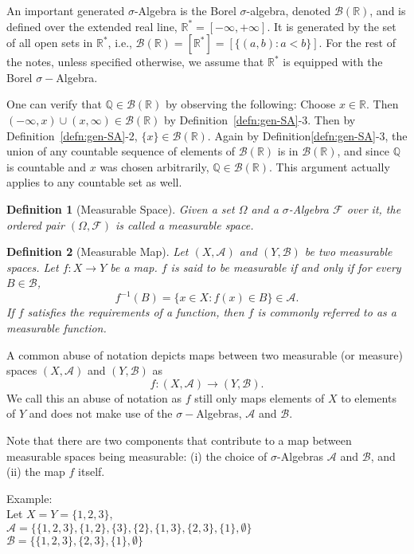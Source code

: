 \documentclass[10pt, oneside]{article}
\newcommand{\R}{\mathbb{R}}
\newcommand{\Q}{\mathbb{Q}}
\newtheorem{defn}{Definition}
\begin{document}
An important generated $\sigma$-Algebra is the Borel $\sigma$-algebra, denoted 
$\mathcal{B}(\R)$, and is defined over the extended real line, $\R^{*} = [-\infty,
+\infty]$. It is generated by the set of all open sets in $\R^{*}$, i.e., 
$\mathcal{B}(\R) = [\R^{*}]=[\{(a,b):a<b\}]$. For the rest of the notes, unless 
specified otherwise, we assume that $\R^{*}$ is equipped with the Borel $\sigma-$Algebra. 

One can verify that $\Q\in \mathcal{B}(\R)$ by observing the following: Choose $x\in \R$. 
Then $(-\infty,x)\cup(x,\infty)\in \mathcal{B}(\R)$ by Definition~\ref{defn:gen-SA}-3.
Then by Definition~\ref{defn:gen-SA}-2, $\{x\}\in \mathcal{B}(\R)$.
Again by Definition\ref{defn:gen-SA}-3, the union of any countable sequence of elements of $\mathcal{B}(\R)$ is in $\mathcal{B}(\R)$, and since $\Q$ is countable and $x$ was chosen arbitrarily, $\Q\in \mathcal{B}(\R)$.
This argument actually applies to any countable set as well.

\begin{defn}[Measurable Space]
    \label{defn:space}
    Given a set $\Omega$ and a $\sigma$-Algebra $\mathcal{F}$ over it, the ordered 
    pair $(\Omega,\mathcal{F})$ is called a measurable space. 
\end{defn}

\begin{defn}[Measurable Map]
    \label{defn:map}
    Let $(X,\mathcal{A})$ and $(Y,\mathcal{B})$ be two measurable spaces. Let 
    $f \colon X \to Y$ be a map. $f$ is said to be measurable if and only if 
    for every $B \in \mathcal{B}$, 
    \[f^{-1}(B) = \{x \in X \colon f(x) \in B\} \in \mathcal{A}.\]
    If $f$ satisfies the requirements of a function, then $f$ is commonly referred 
    to as a measurable function. 
\end{defn}
A common abuse of notation depicts maps between two measurable (or measure) spaces 
$(X,\mathcal{A})$ and $(Y, \mathcal{B})$ as 
\[f \colon (X,\mathcal{A}) \to (Y,\mathcal{B}). \]
We call this an abuse of notation as $f$ still only maps elements of $X$ to elements
of $Y$ and does not make use of the $\sigma-$Algebras, $\mathcal{A}$ and $\mathcal{B}$. 

Note that there are two components that contribute to a map between measurable spaces
being measurable: (i) the choice of $\sigma$-Algebras $\mathcal{A}$ and $\mathcal{B}$,
and (ii) the map $f$ itself. 

Example:\\ Let $X=Y=\{1,2,3\}$, \\$\mathcal{A}=\{\{1,2,3\},\{1,2\},\{3\},\{2\},\{1,3\},\{2,3\},\{1\},\emptyset\}$ \\ $\mathcal{B}=\{\{1,2,3\},\{2,3\},\{1\},\emptyset\}$ \\
\end{document}
